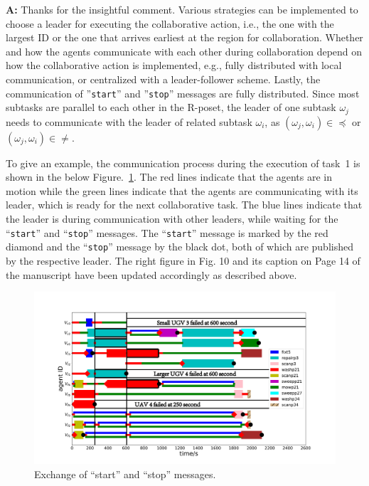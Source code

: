 \documentclass[10pt]{article}
\begin{document}
\textbf{A:} Thanks for the insightful comment.
Various strategies can be implemented to choose a leader for executing the collaborative action,
i.e., the one with the largest ID or the one that arrives earliest at the region for collaboration.
Whether and how the agents communicate with each other during collaboration depend on
how the collaborative action is implemented, e.g., fully distributed with local communication,
or centralized with a leader-follower scheme.
Lastly, the communication of ''\texttt{start}'' and
''\texttt{stop}'' messages are fully distributed.
Since most subtasks are parallel to each other in the R-poset,
the leader of one subtask $\omega_j$ needs to communicate
with the leader of related subtask $\omega_i$, as $(\omega_j,\omega_i)\in\preceq$ or $(\omega_j,\omega_i)\in\neq$.

To give an example,
the communication process during the execution of task~1 is shown in the below Figure.~\ref{fig:communicate}.
The red lines indicate that the agents are in motion
while the green lines indicate that the agents are communicating with its leader, which is ready for the next collaborative task.
The blue lines indicate that the leader is during communication with other leaders,
while waiting for the ``\texttt{start}'' and ``\texttt{stop}'' messages.
The ``\texttt{start}'' message is marked by the red diamond and
the ``\texttt{stop}'' message by the black dot, both of which are published by the respective leader.
The right figure in Fig. 10 and its caption on Page 14 of the manuscript have been updated accordingly as described above.
\begin{figure}[ht]
 	\centering
 	\includegraphics[scale=0.20]{figs/gantt_communicate1.pdf}
 	\caption{Exchange of ``start'' and ``stop'' messages.}
 	\label{fig:communicate}
\end{figure}
\end{document}
